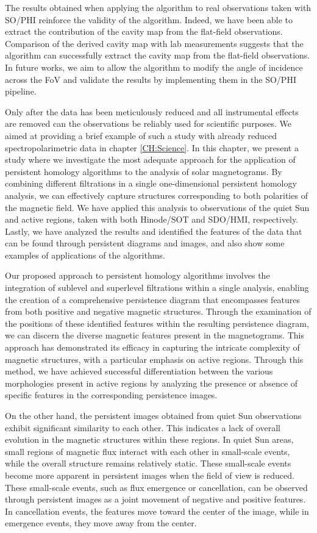The results obtained when applying the algorithm to real observations taken with SO/PHI reinforce the validity of the algorithm. Indeed, we have been able to extract the contribution of the cavity map from the flat-field observations. Comparison of the derived cavity map with lab measurements suggests that the algorithm can successfully extract the cavity map from the flat-field observations. In future works, we aim to allow the algorithm to modify the angle of incidence across the FoV and validate the results by implementing them in the SO/PHI pipeline.

Only after the data has been meticulously reduced and all instrumental effects are removed can the observations be reliably used for scientific purposes. We aimed at providing a brief example of such a study with already reduced spectropolarimetric data in chapter \ref{CH:Science}. In this chapter, we present a study where we investigate the most adequate approach for the application of persistent homology algorithms to the analysis of solar magnetograms. By combining different filtrations in a single one-dimensional persistent homology analysis, we can effectively capture structures corresponding to both polarities of the magnetic field. We have applied this analysis to observations of the quiet Sun and active regions, taken with both Hinode/SOT and SDO/HMI, respectively. Lastly, we have analyzed the results and identified the features of the data that can be found through persistent diagrams and images, and also show some examples of applications of the algorithms. 

Our proposed approach to persistent homology algorithms involves the integration of sublevel and superlevel filtrations within a single analysis, enabling the creation of a comprehensive persistence diagram that encompasses features from both positive and negative magnetic structures. Through the examination of the positions of these identified features within the resulting persistence diagram, we can discern the diverse magnetic features present in the magnetograms. This approach has demonstrated its efficacy in capturing the intricate complexity of magnetic structures, with a particular emphasis on active regions. Through this method, we have achieved successful differentiation between the various morphologies present in active regions by analyzing the presence or absence of specific features in the corresponding persistence images. 

On the other hand, the persistent images obtained from quiet Sun observations exhibit significant similarity to each other. This indicates a lack of overall evolution in the magnetic structures within these regions. In quiet Sun areas, small regions of magnetic flux interact with each other in small-scale events, while the overall structure remains relatively static. These small-scale events become more apparent in persistent images when the field of view is reduced. These small-scale events, such as flux emergence or cancellation, can be observed through persistent images as a joint movement of negative and positive features. In cancellation events, the features move toward the center of the image, while in emergence events, they move away from the center.

